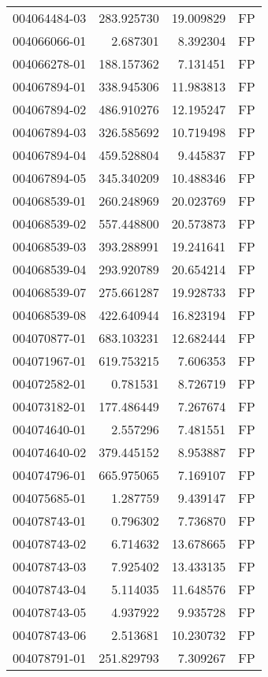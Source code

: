 \begin{tabular}{lrrl}
004064484-03 &  283.925730 &    19.009829 &   FP \\
004066066-01 &    2.687301 &     8.392304 &   FP \\
004066278-01 &  188.157362 &     7.131451 &   FP \\
004067894-01 &  338.945306 &    11.983813 &   FP \\
004067894-02 &  486.910276 &    12.195247 &   FP \\
004067894-03 &  326.585692 &    10.719498 &   FP \\
004067894-04 &  459.528804 &     9.445837 &   FP \\
004067894-05 &  345.340209 &    10.488346 &   FP \\
004068539-01 &  260.248969 &    20.023769 &   FP \\
004068539-02 &  557.448800 &    20.573873 &   FP \\
004068539-03 &  393.288991 &    19.241641 &   FP \\
004068539-04 &  293.920789 &    20.654214 &   FP \\
004068539-07 &  275.661287 &    19.928733 &   FP \\
004068539-08 &  422.640944 &    16.823194 &   FP \\
004070877-01 &  683.103231 &    12.682444 &   FP \\
004071967-01 &  619.753215 &     7.606353 &   FP \\
004072582-01 &    0.781531 &     8.726719 &   FP \\
004073182-01 &  177.486449 &     7.267674 &   FP \\
004074640-01 &    2.557296 &     7.481551 &   FP \\
004074640-02 &  379.445152 &     8.953887 &   FP \\
004074796-01 &  665.975065 &     7.169107 &   FP \\
004075685-01 &    1.287759 &     9.439147 &   FP \\
004078743-01 &    0.796302 &     7.736870 &   FP \\
004078743-02 &    6.714632 &    13.678665 &   FP \\
004078743-03 &    7.925402 &    13.433135 &   FP \\
004078743-04 &    5.114035 &    11.648576 &   FP \\
004078743-05 &    4.937922 &     9.935728 &   FP \\
004078743-06 &    2.513681 &    10.230732 &   FP \\
004078791-01 &  251.829793 &     7.309267 &   FP \\

\end{tabular}
